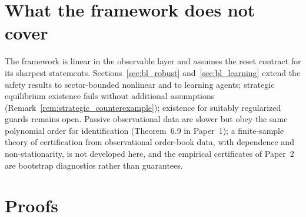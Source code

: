 \documentclass[11pt]{article}
\theoremstyle{definition}
\theoremstyle{remark}
\begin{document}
\section{What the framework does not cover}\label{sec:fw_scope}

The framework is linear in the observable layer and assumes the reset contract for its sharpest statements. Sections~\ref{sec:bl_robust} and~\ref{sec:bl_learning} extend the safety results to sector-bounded nonlinear and to learning agents; strategic equilibrium existence fails without additional assumptions (Remark~\ref{rem:strategic_counterexample}); existence for suitably regularized guards remains open. Passive observational data are slower but obey the same polynomial order for identification (Theorem~\textup{6.9 in Paper~1}); a finite-sample theory of certification from observational order-book data, with dependence and non-stationarity, is not developed here, and the empirical certificates of Paper~2 are bootstrap diagnostics rather than guarantees.

\appendix
\section{Proofs}
\end{document}
